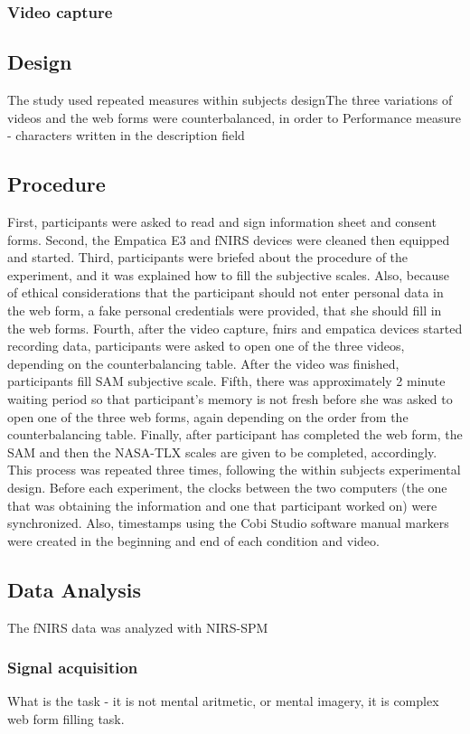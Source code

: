 \documentclass[a4paper]{report}
\begin{document}
			\subsubsection{Video capture}
		\subsection{Design}
		The study used repeated measures within subjects designThe three variations of videos and the web forms were counterbalanced, in order to
		Performance measure - characters written in the description field
		\subsection{Procedure}
		First, participants were asked to read and sign information sheet and consent forms. Second, the Empatica E3 and fNIRS devices were cleaned then equipped and started. Third, participants were briefed about the procedure of the experiment, and it was explained how to fill the subjective scales. Also, because of ethical considerations that the participant should not enter personal data in the web form, a fake personal credentials were provided, that she should fill in the web forms. Fourth, after the video capture, fnirs and empatica devices started recording data, participants were asked to open one of the three videos, depending on the counterbalancing table. After the video was finished, participants fill SAM subjective scale. Fifth, there was approximately 2 minute waiting period so that participant's memory is not fresh before she was asked to open one of the three web forms, again depending on the order from the counterbalancing table. Finally, after participant has completed the web form, the SAM and then the NASA-TLX scales are given to be completed, accordingly. This process was repeated three times, following the within subjects experimental design.
		Before each experiment, the clocks between the two computers (the one that was obtaining the information and one that participant worked on) were synchronized. Also, timestamps using the Cobi Studio software manual markers were created in the beginning and end of each condition and video. 
		\subsection{Data Analysis}
		The fNIRS data was analyzed with NIRS-SPM\cite{ye2009nirs}		
			\subsubsection{Signal acquisition}
			What is the task - it is not mental aritmetic, or mental imagery, it is complex web form filling task.
\end{document}
